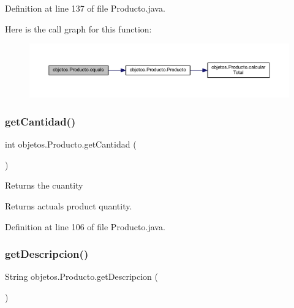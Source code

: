 Definition at line 137 of file Producto.\+java.

Here is the call graph for this function\+:\nopagebreak
\begin{figure}[H]
\begin{center}
\leavevmode
\includegraphics[width=350pt]{classobjetos_1_1_producto_a69f1b30e6711e637dbfd074c057adeee_cgraph}
\end{center}
\end{figure}
\mbox{\label{classobjetos_1_1_producto_a33cadb40029d686345420c930bcabacf}} 
\subsubsection{\texorpdfstring{get\+Cantidad()}{getCantidad()}}
{\footnotesize\ttfamily int objetos.\+Producto.\+get\+Cantidad (\begin{DoxyParamCaption}{ }\end{DoxyParamCaption})}

Returns the cuantity

\begin{DoxyReturn}{Returns}
actual\textquotesingle{}s product quantity. 
\end{DoxyReturn}


Definition at line 106 of file Producto.\+java.

\mbox{\label{classobjetos_1_1_producto_a47b9a05a0e7a504aaa56564c1b146927}} 
\subsubsection{\texorpdfstring{get\+Descripcion()}{getDescripcion()}}
{\footnotesize\ttfamily String objetos.\+Producto.\+get\+Descripcion (\begin{DoxyParamCaption}{ }\end{DoxyParamCaption})}



